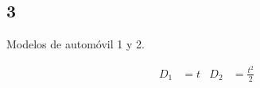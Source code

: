 \subsection*{3}

Modelos de automóvil 1 y 2.

\begin{align*}
    D_1 &= t &
    D_2 &= \frac{t^2}{2}
\end{align*}


